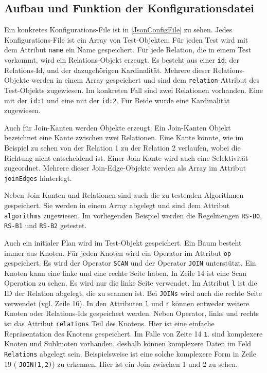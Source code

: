 \subsection{Aufbau und Funktion der Konfigurationsdatei}

Ein konkretes Konfigurations-File ist in \ref{JsonConfigFile} zu sehen. Jedes Konfigurations-File ist ein Array von Test-Objekten. Für jeden Test wird mit dem Attribut \texttt{name} ein Name gespeichert. Für jede Relation, die in einem Test vorkommt, wird ein Relations-Objekt erzeugt. Es besteht aus einer \texttt{id}, der Relations-Id, und der dazugehörigen Kardinalität. Mehrere dieser Relations-Objekte werden in einem Array gespeichert und sind dem \texttt{relation}-Attribut des Test-Objekts zugewiesen. Im konkreten Fall sind zwei Relationen vorhanden. Eine mit der \texttt{id:1} und eine mit der \texttt{id:2}. Für Beide wurde eine Kardinalität zugewiesen. 

Auch für Join-Kanten werden Objekte erzeugt. Ein Join-Kanten Objekt bezeichnet eine Kante zwischen zwei Relationen. Eine Kante könnte, wie im Beispiel zu sehen von der Relation 1 zu der Relation 2 verlaufen, wobei die Richtung nicht entscheidend ist. Einer Join-Kante wird auch eine Selektivität zugeordnet. Mehrere dieser Join-Edge-Objekte werden als Array im Attribut \texttt{joinEdges} hinterlegt.

Neben Join-Kanten und Relationen sind auch die zu testenden Algorithmen gespeichert. Sie werden in einem Array abgelegt und sind dem Attribut \texttt{algorithms} zugewiesen. Im vorliegenden Beispiel werden die Regelmengen \texttt{RS-B0}, \texttt{RS-B1} und \texttt{RS-B2} getestet.

Auch ein initialer Plan wird im Test-Objekt gespeichert. Ein Baum besteht immer aus Knoten. Für jeden Knoten wird ein Operator im Attribut \texttt{op} gespeichert. Es wird der Operator \texttt{SCAN} und der Operator \texttt{JOIN} unterstützt. Ein Knoten kann eine linke und eine rechte Seite haben. In Zeile 14 ist eine Scan Operation zu sehen. Es wird nur die linke Seite verwendet. Im Attribut \texttt{l} ist die ID der Relation abgelegt, die zu scannen ist. Bei \texttt{JOINs} wird auch die rechte Seite verwendet (vgl. Zeile 16). In den Attributen \texttt{l} und \texttt{r} können entweder weitere Knoten oder Relations-Ids gespeichert werden. Neben Operator, links und rechts ist das Attribut \texttt{relations} Teil des Knotens. Hier ist eine einfache Repräsentation des Knotens gespeichert. Im Falle von Zeite 14 \texttt{1}. sind komplexere Knoten und Subknoten vorhanden, deshalb  können komplexere Daten im Feld \texttt{Relations} abgelegt sein. Beispielsweise ist eine solche komplexere Form in Zeile 19 ( \texttt{JOIN(1,2)}) zu erkennen. Hier ist ein Join zwischen 1 und 2 zu sehen.

